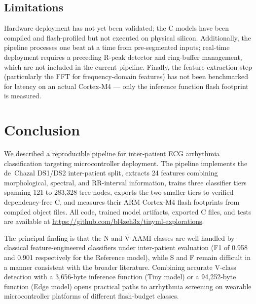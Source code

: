 \documentclass[journal,twoside]{IEEEtran}
\begin{document}
\subsection{Limitations}

Hardware deployment has not yet been validated; the C models have been
compiled and flash-profiled but not executed on physical silicon.
Additionally, the pipeline processes one beat at a time from pre-segmented
inputs; real-time deployment requires a preceding R-peak detector and
ring-buffer management, which are not included in the current pipeline.
Finally, the feature extraction step (particularly the FFT for
frequency-domain features) has not been benchmarked for latency on an
actual Cortex-M4 — only the inference function flash footprint is measured.

\section{Conclusion}
We described a reproducible pipeline for inter-patient ECG arrhythmia
classification targeting microcontroller deployment. The pipeline implements
the de~Chazal DS1/DS2 inter-patient split, extracts 24 features combining
morphological, spectral, and RR-interval information, trains three
classifier tiers spanning 121 to 283{,}328 tree nodes, exports the two
smaller tiers to verified dependency-free C, and measures their ARM
Cortex-M4 flash footprints from compiled object files. All code, trained
model artifacts, exported C files, and tests are available at
\url{https://github.com/bl4zeh3x/tinyml-explorations}.

The principal finding is that the N and V AAMI classes are well-handled
by classical feature-engineered classifiers under inter-patient evaluation
(F1 of 0.958 and 0.901 respectively for the Reference model), while S and
F remain difficult in a manner consistent with the broader literature.
Combining accurate V-class detection with a 3{,}656-byte inference
function (Tiny model) or a 94{,}252-byte function (Edge model) opens
practical paths to arrhythmia screening on wearable microcontroller
platforms of different flash-budget classes.



\end{document}
